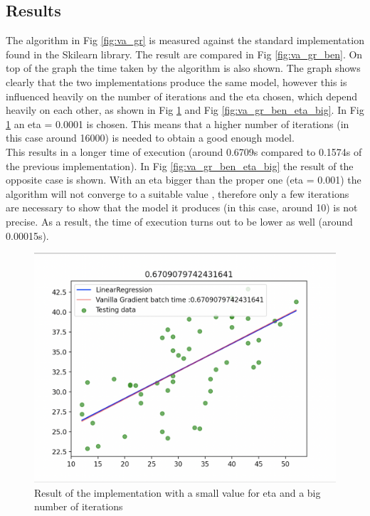 \documentclass[conference]{IEEEtran}
\begin{document}
\subsection{Results}
The algorithm in Fig \ref{fig:va_gr} is measured against the standard implementation found in the Skilearn library. The result are compared in Fig \ref{fig:va_gr_ben}. On top of the graph the time taken by the algorithm is also shown.
The graph shows clearly that the two implementations produce the same model, however this is influenced heavily on the number of iterations and the eta chosen, which depend heavily on each other, as shown in Fig \ref{fig:va_gr_ben_eta_small} and Fig \ref{fig:va_gr_ben_eta_big}. 
In Fig \ref{fig:va_gr_ben_eta_small} an eta = 0.0001 is chosen. This means that a higher number of iterations (in this case around 16000) is needed to obtain a good enough model.\cite{Scikit-Learn} \\
This results in a longer time of execution (around 0.6709s compared to 0.1574s of the previous implementation). 
In Fig \ref{fig:va_gr_ben_eta_big} the result of the opposite case is shown. With an eta bigger than the proper one (eta = 0.001) the algorithm will not converge to a suitable value \cite{Scikit-Learn}, therefore only a few iterations are necessary to show that the model it produces (in this case, around 10) is not precise. As a result, the time of execution turns out to be lower as well (around 0.00015s).


\begin{figure}[ht]
    \includegraphics[scale=0.35]{Fig2.png}
    \caption{Result of the implementation with a small value for eta and a big number of iterations}
    \label{fig:va_gr_ben_eta_small}
\end{figure}
\end{document}
